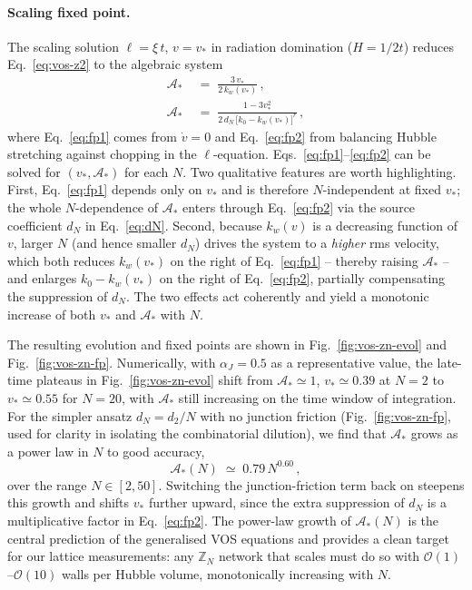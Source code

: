 \paragraph{Scaling fixed point.}
The scaling solution $\ell = \xi\,t$, $v = v_{*}$ in radiation domination
($H=1/2t$) reduces Eq.~\eqref{eq:vos-z2} to the algebraic system
\begin{align}
\label{eq:fp1}
\mathcal{A}_{*} \;&=\; \frac{3\,v_{*}}{2\,k_w(v_{*})}\,, \\[0.5ex]
\label{eq:fp2}
\mathcal{A}_{*} \;&=\; \frac{1 - 3 v_{*}^{2}}
                          {2\,d_N\,\bigl[k_0 - k_w(v_{*})\bigr]^{r}}\,,
\end{align}
where Eq.~\eqref{eq:fp1} comes from $\dot v = 0$ and
Eq.~\eqref{eq:fp2} from balancing Hubble stretching against chopping in
the $\ell$-equation. Eqs.~\eqref{eq:fp1}--\eqref{eq:fp2} can be solved
for $(v_{*},\mathcal{A}_{*})$ for each $N$. Two qualitative features
are worth highlighting. First, Eq.~\eqref{eq:fp1} depends only on
$v_{*}$ and is therefore $N$-independent at fixed $v_{*}$; the whole
$N$-dependence of $\mathcal{A}_{*}$ enters through Eq.~\eqref{eq:fp2}
via the source coefficient $d_N$ in Eq.~\eqref{eq:dN}. Second,
because $k_w(v)$ is a decreasing function of $v$, larger $N$ (and hence
smaller $d_N$) drives the system to a \emph{higher} rms velocity, which
both reduces $k_w(v_*)$ on the right of Eq.~\eqref{eq:fp1} -- thereby
raising $\mathcal{A}_{*}$ -- and enlarges $k_0-k_w(v_*)$ on the right of
Eq.~\eqref{eq:fp2}, partially compensating the suppression of $d_N$.
The two effects act coherently and yield a monotonic increase of both
$v_{*}$ and $\mathcal{A}_{*}$ with $N$.

The resulting evolution and fixed points are shown in
Fig.~\ref{fig:vos-zn-evol} and Fig.~\ref{fig:vos-zn-fp}. Numerically,
with $\alpha_J=0.5$ as a representative value, the late-time plateaus
in Fig.~\ref{fig:vos-zn-evol} shift from $\mathcal{A}_{*}\simeq 1$,
$v_{*}\simeq 0.39$ at $N=2$ to $v_{*}\simeq 0.55$ for $N=20$, with
$\mathcal{A}_{*}$ still increasing on the time window of integration.
For the simpler ansatz $d_N=d_2/N$ with no junction friction
(Fig.~\ref{fig:vos-zn-fp}, used for clarity in isolating the
combinatorial dilution), we find that $\mathcal{A}_{*}$ grows as a
power law in $N$ to good accuracy,
\begin{equation}
\label{eq:Astar-fit}
\mathcal{A}_{*}(N) \;\simeq\; 0.79\,N^{0.60}\,,
\end{equation}
over the range $N\in[2,50]$. Switching the junction-friction term back
on steepens this growth and shifts $v_{*}$ further upward, since the
extra suppression of $d_N$ is a multiplicative factor in
Eq.~\eqref{eq:fp2}. The power-law growth of $\mathcal{A}_{*}(N)$ is
the central prediction of the generalised VOS equations and provides a
clean target for our lattice measurements: any $\mathbb{Z}_N$ network
that scales must do so with $\mathcal{O}(1)$--$\mathcal{O}(10)$ walls
per Hubble volume, monotonically increasing with $N$.

